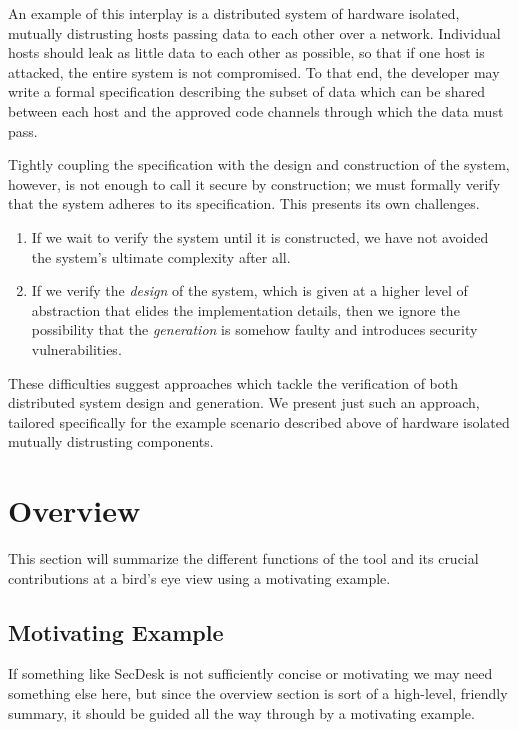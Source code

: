 \documentclass[conference,compsoc]{IEEEtran}
\begin{document}
An example of this interplay is a distributed system of hardware isolated,
mutually distrusting hosts passing data to each other over a network. Individual
hosts should leak as little data to each other as possible, so that if one host
is attacked, the entire system is not compromised. To that end, the developer
may write a formal specification describing the subset of data which can be
shared between each host and the approved code channels through which the data
must pass.

Tightly coupling the specification with the design and construction of
the system, however, is not enough to call it secure by construction; we
must formally verify that the system adheres to its specification. This presents
its own challenges.

    \begin{enumerate}

        \item{If we wait to verify the system until it is constructed, we have
              not avoided the system's ultimate complexity after all.}
        \item{If we verify the \textit{design} of the system, which is given at
              a higher level of abstraction that elides the implementation
              details, then we ignore the possibility that the
              \textit{generation} is somehow faulty and introduces security
              vulnerabilities.}

    \end{enumerate}

These difficulties suggest approaches which tackle the verification of both
distributed system design and generation. We present just such an approach,
tailored specifically for the example scenario described above of hardware
isolated mutually distrusting components.

\section{Overview}

    This section will summarize the different functions of the tool and its
    crucial contributions at a bird's eye view using a motivating example.

    \subsection{Motivating Example}

        If something like SecDesk is not sufficiently concise or motivating we
        may need something else here, but since the overview section is sort of
        a high-level, friendly summary, it should be guided all the way through
        by a motivating example.
\end{document}
